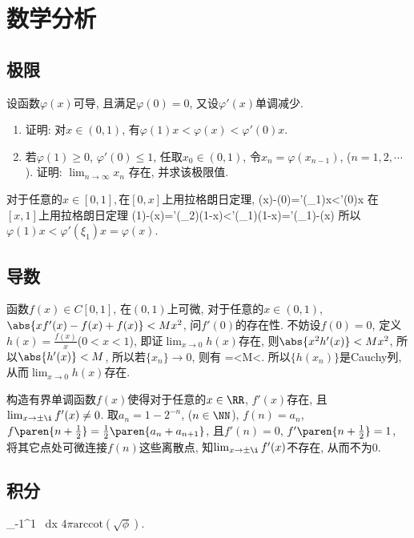 \chapter{数学分析}
\section{极限}
\bq{}{}
设函数$\varphi(x)$可导, 且满足$\varphi(0)=0$, 又设$\varphi'(x)$单调减少. 
\begin{enumerate}
\item 证明: 对$x\in(0,1)$, 有$\varphi(1)x<\varphi(x)<\varphi'(0)x$.
\item 若$\varphi(1)\ge0$, $\varphi'(0)\le1$, 任取$x_{0}\in(0,1)$, 令$x_{n}=\varphi(x_{n-1})$,
($n=1,2,\cdots$). 证明: $\lim_{n\to\infty}x_{n}$ 存在, 并求该极限值.
\end{enumerate}
\eq
\ba
对于任意的$x\in[0,1],$在$[0,x]$上用拉格朗日定理,
\bee
\varphi(x)-\varphi(0)=\varphi'(\xi_{1})x<\varphi'(0)x
\eee
在$[x,1]$上用拉格朗日定理
\bee
\varphi(1)-\varphi(x)=\varphi'(\xi_{2})(1-x)<\varphi'(\xi_{1})(1-x)=\varphi'(\xi_{1})-\varphi(x)
\eee
所以$\varphi(1)x<\varphi'(\xi_{1})x=\varphi(x)$.
\ea

\section{导数}

\bq{}{}
函数$f(x)\in C[0,1]$, 在$(0,1)$上可微, 对于任意的$x\in(0,1)$, $\abs{xf'(x)-f(x)+f(x)}<Mx^2$, 问$f'(0)$的存在性.
\eq
\ba
不妨设$f(0)=0$, 定义$h(x)=\frac{f(x)}{x}$($0<x<1$), 即证$\lim_{x\to0}h(x)$存在, 则$\abs{x^2h'(x)}<Mx^2$,
所以$\abs{h'(x)}<M$, 所以若$\{x_n\}\to0$, 则有
\bee
{}=<M<\varepsilon.
\eee
所以$\{h(x_n)\}$是Cauchy列, 从而$\lim_{x\to0}h(x)$存在.
\ea

\bq{}{}
构造有界单调函数$f(x)$使得对于任意的$x\in\RR$, $f'(x)$存在, 且$\lim_{x\to\pm\i}f'(x)\ne0$.
\eq
\ba
取$a_n=1-2^{-n}$, ($n\in\NN$), $f(n)=a_n$, $f\paren{n+\frac12}=\frac12\paren{a_n+a_{n+1}}$, 
且$f'(n)=0$, $f'\paren{n+\frac12}=1$, 将其它点处可微连接$f(n)$这些离散点, 知$\lim_{x\to\pm\i}f'(x)$不存在, 从而不为0.
\ea

\section{积分}

\bq{}{}
\bee
\int_{-1}^1  \, dx
\eee
\eq
\ba
$4\pi \mathrm{arccot}(\sqrt{\phi}).$
\ea

